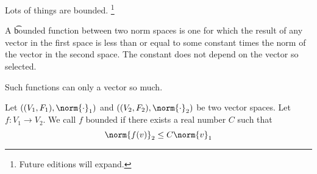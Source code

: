 
Lots of things are bounded.
  \ifhmode\unskip\fi\footnote{
Future editions will expand.
  }

A \t{bounded function} between two norm spaces is one for which the result of any vector in the first space is less than or equal to some constant times the norm of the vector in the second space.
The constant does not depend on the vector so selected.

Such functions can only  a vector so much.


Let $((V_1, F_1), \norm{\cdot}_1)$ and $((V_2, F_2), \norm{\cdot}_2)$ be two vector spaces.
Let $f: V_1 \to V_2$.
We call $f$ bounded if there exists a real number $C$ such that
  \[
\norm{f(v)}_2 \leq C \norm{v}_1
  \]

\blankpage
